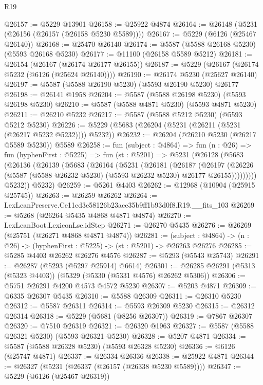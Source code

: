 \begin{lexlean}{R19}
\begin{coremodule}
@26157 := @5229 @13901
@26158 := @25922 @4874
@26164 := @26148 (@5231 (@26156 (@26157 (@26158 @5230 @5589))))
@26167 := @5229 (@6126 (@25467 @26140))
@26168 := @25470 @26140
@26174 := @5587 (@5588 @26168 @5230) (@5593 @26168 @5230)
@26177 := @11100 (@26158 @5589 @5212)
@26181 := @26154 (@26167 (@26174 @26177 @26155))
@26187 := @5229 (@26167 (@26174 @5232 (@6126 (@25624 @26140))))
@26190 := @26174 @5230 (@25627 @26140)
@26197 := @5587 (@5588 @26190 @5230) (@5593 @26190 @5230) @26177
@26198 := @26141 @1958
@26204 := @5587 (@5588 @26198 @5230) (@5593 @26198 @5230)
@26210 := @5587 (@5588 @4871 @5230) (@5593 @4871 @5230)
@26211 := @26210 @5232
@26217 := @5587 (@5588 @5212 @5230) (@5593 @5212 @5230)
@26226 := @5229 (@5683 (@26204 (@5231 (@26211 (@5231 (@26217 @5232 @5232)))) @5232))
@26232 := @26204 (@26210 @5230 (@26217 @5589 @5230)) @5589
@26258 := fun (subject : @4864) =>
  fun (n : @26) =>
  fun (hyphenFirst : @5225) =>
  fun (st : @5201) =>
  @5231
    (@26128
      (@5683
        (@26136
          (@26139
            (@5683
              (@26164
                (@5231
                  (@26181
                    (@26187
                      (@26197
                        (@26226
                          (@5587 (@5588 @26232 @5230) (@5593 @26232 @5230) @26177 @26155)))))))))
          @5232))
      @5232)
@26259 := @5261 @4403
@26262 := @12968 (@10904 (@25915 @25745))
@26263 := @26259 @26262
@26264 := LexLeanPreserve.Ce11ed3e58126b23ace35b9ff1b93d0f8.R19.__fits_103
@26269 := @5268 (@26264 @5435 @4868 @4871 @4874)
@26270 := LexLeanBoot.LexiconLse.idStep
@26271 := @26270 @5435
@26276 := @26269 (@25751 (@26271 @4868 @4871 @4874))
@26281 := (subject : @4864) -> (n : @26) -> (hyphenFirst : @5225) -> (st : @5201) -> @26263 @26276
@26285 := @5285 @4403 @26262 @26276 @4576
@26287 := @5293 (@5543 @25743)
@26291 := @26287 (@5293 (@5297 @25914) @6614)
@26301 := @26285 @26291 (@5313 (@5323 @4403)) (@5329 (@5330 (@5331 @4576) @26262 @5306))
@26306 := @5751 @26291 @4200 @4573 @4572 @5230
@26307 := @5203 @4871
@26309 := @6335 @26307 @5435
@26310 := @5588 @26309
@26311 := @26310 @5230
@26312 := @5587 @26311
@26314 := @5593 @26309 @5230
@26315 := @26312 @26314
@26318 := @5229 (@5681 (@8256 @26307))
@26319 := @7867 @26307
@26320 := @7510 @26319
@26321 := @26320 @1963
@26327 := @5587 (@5588 @26321 @5230) (@5593 @26321 @5230)
@26328 := @5207 @4871
@26334 := @5587 (@5588 @26328 @5230) (@5593 @26328 @5230)
@26336 := @6126 (@25747 @4871)
@26337 := @26334 @26336
@26338 := @25922 @4871
@26344 := @26327 (@5231 (@26337 (@26157 (@26338 @5230 @5589))))
@26347 := @5229 (@6126 (@25467 @26319))

\end{coremodule}
\end{lexlean}
